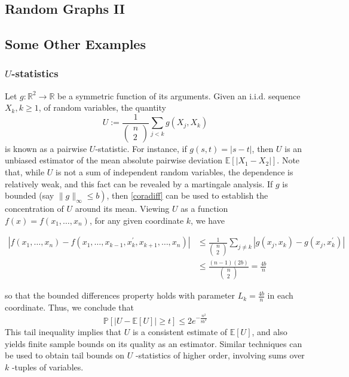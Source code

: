 \documentclass{article}
\begin{document}
\subsection{Random Graphs II}\label{ssec:graphexamII}

\subsection{Some Other Examples}\label{ssec:someexam}
\subsubsection{$U$-statistics}
Let $g: \mathbb{R}^{2} \rightarrow \mathbb{R}$ be a symmetric function of its arguments. Given an i.i.d. sequence $X_{k}, k \geq 1$, of random variables, the quantity
$$
U:=\frac{1}{\left(\begin{array}{l}
n \\
2
\end{array}\right)} \sum_{j<k} g\left(X_{j}, X_{k}\right)
$$
is known as a pairwise $U$-statistic. For instance, if $g(s, t)=|s-t|$, then $U$ is an unbiased estimator of the mean absolute pairwise deviation $\mathbb{E}\left[\left|X_{1}-X_{2}\right|\right] .$ Note that, while $U$ is not a sum of independent random variables, the dependence is relatively weak, and this fact can be revealed by a martingale analysis. If $g$ is bounded (say $\left.\|g\|_{\infty} \leq b\right)$, then \cref{coradiff} can be used to establish the concentration of $U$ around its mean. Viewing $U$ as a function $f(x)=f\left(x_{1}, \ldots, x_{n}\right)$, for any given coordinate $k$, we have

\begin{align*}
\left|f\left(x_{1}, \ldots, x_{n}\right)-f\left(x_{1}, \ldots, x_{k-1}, x_{k}^{\prime}, x_{k+1}, \ldots, x_{n}\right)\right| & \leq \frac{1}{\left(\begin{array}{l}
n \\
2
\end{array}\right)} \sum_{j \neq k}\left|g\left(x_{j}, x_{k}\right)-g\left(x_{j}, x_{k}^{\prime}\right)\right| \\
& \leq \frac{(n-1)(2 b)}{\left(\begin{array}{l}
n \\
2
\end{array}\right)}=\frac{4 b}{n}
\end{align*}

so that the bounded differences property holds with parameter $L_{k}=\frac{4 b}{n}$ in each coordinate. Thus, we conclude that
$$
\mathbb{P}[|U-\mathbb{E}[U]| \geq t] \leq 2 e^{-\frac{n^{2}}{8 b^{2}}}
$$
This tail inequality implies that $U$ is a consistent estimate of $\mathbb{E}[U]$, and also yields finite sample bounds on its quality as an estimator. Similar techniques can be used to obtain tail bounds on $U$ -statistics of higher order, involving sums over $k$ -tuples of variables.
\end{document}
